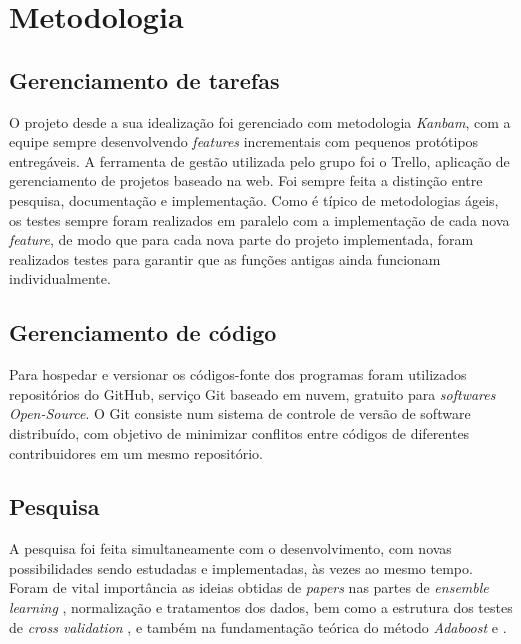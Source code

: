 \chapter{Metodologia}

\section{Gerenciamento de tarefas}
O projeto desde a sua idealização foi gerenciado com metodologia \textit{Kanbam}, com a equipe sempre desenvolvendo \textit{features} incrementais com pequenos protótipos entregáveis. A ferramenta de gestão utilizada pelo grupo foi o Trello, aplicação de gerenciamento de projetos baseado na web. Foi sempre feita a distinção entre pesquisa, documentação e implementação. Como é típico de metodologias ágeis, os testes sempre foram realizados em paralelo com a implementação de cada nova \textit{feature}, de modo que para cada nova parte do projeto implementada, foram realizados testes para garantir que as funções antigas ainda funcionam individualmente.
\section{Gerenciamento de código}
Para hospedar e versionar os códigos-fonte dos programas foram utilizados repositórios do GitHub, serviço Git baseado em nuvem, gratuito para \textit{softwares Open-Source}. O Git consiste num sistema de controle de versão de software distribuído, com objetivo de minimizar conflitos entre códigos de diferentes contribuidores em um mesmo repositório.

\section{Pesquisa} 
A pesquisa foi feita simultaneamente com o desenvolvimento, com novas possibilidades sendo estudadas e implementadas, às vezes ao mesmo tempo. Foram de vital importância as ideias obtidas de \textit{papers} nas partes de \textit{ensemble learning} \cite{comparativeEN}, normalização e tratamentos dos dados, bem como a estrutura dos testes de \textit{cross validation} \cite{comparative}, e também na fundamentação teórica do método \textit{Adaboost} \cite{explainingadaboost} e \cite{adaboost}.